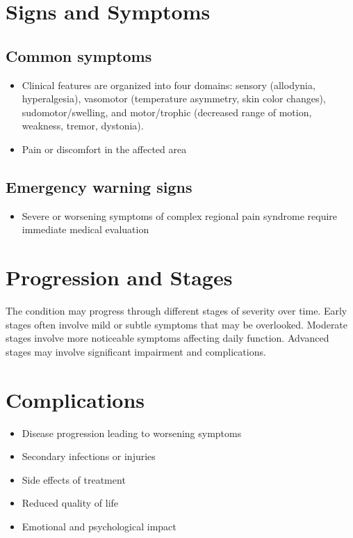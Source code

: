 \section{Signs and Symptoms}

\subsection{Common symptoms}
\begin{itemize}[noitemsep]
  \item Clinical features are organized into four domains: sensory (allodynia, hyperalgesia), vasomotor (temperature asymmetry, skin color changes), sudomotor/swelling, and motor/trophic (decreased range of motion, weakness, tremor, dystonia).

  \item Pain or discomfort in the affected area
  \end{itemize}

\subsection{Emergency warning signs}
\begin{itemize}[noitemsep]
  \item Severe or worsening symptoms of complex regional pain syndrome require immediate medical evaluation
\end{itemize}
\section{Progression and Stages}
The condition may progress through different stages of severity over time. Early stages often involve mild or subtle symptoms that may be overlooked. Moderate stages involve more noticeable symptoms affecting daily function. Advanced stages may involve significant impairment and complications.
\section{Complications}
\begin{itemize}[noitemsep]
  \item Disease progression leading to worsening symptoms
  \item Secondary infections or injuries
  \item Side effects of treatment
  \item Reduced quality of life
  \item Emotional and psychological impact
\end{itemize}
